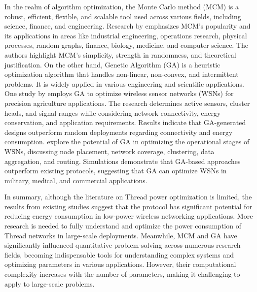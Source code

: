 In the realm of algorithm optimization, the Monte Carlo method (MCM) is a robust, efficient, flexible, and scalable tool used across various fields, including science, finance, and engineering. Research by \textcite{kroese2014monte} emphasizes MCM's popularity and its applications in areas like industrial engineering, operations research, physical processes, random graphs, finance, biology, medicine, and computer science. The authors highlight MCM's simplicity, strength in randomness, and theoretical justification. On the other hand, Genetic Algorithm (GA) is a heuristic optimization algorithm that handles non-linear, non-convex, and intermittent problems. It is widely applied in various engineering and scientific applications. One study by \textcite{ferentinos2005energy} employs GA to optimize wireless sensor networks (WSNs) for precision agriculture applications. The research determines active sensors, cluster heads, and signal ranges while considering network connectivity, energy conservation, and application requirements. Results indicate that GA-generated designs outperform random deployments regarding connectivity and energy consumption. \textcite{norouzi2014genetic} explore the potential of GA in optimizing the operational stages of WSNs, discussing node placement, network coverage, clustering, data aggregation, and routing. Simulations demonstrate that GA-based approaches outperform existing protocols, suggesting that GA can optimize WSNs in military, medical, and commercial applications.

In summary, although the literature on Thread power optimization is limited, the results from existing studies suggest that the protocol has significant potential for reducing energy consumption in low-power wireless networking applications. More research is needed to fully understand and optimize the power consumption of Thread networks in large-scale deployments. Meanwhile, MCM and GA have significantly influenced quantitative problem-solving across numerous research fields, becoming indispensable tools for understanding complex systems and optimizing parameters in various applications. However, their computational complexity increases with the number of parameters, making it challenging to apply to large-scale problems.
